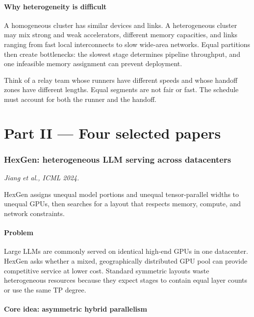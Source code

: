 \documentclass[10pt,a4paper]{article}
\begin{document}
\subsection{Why heterogeneity is difficult}

A homogeneous cluster has similar devices and links. A heterogeneous cluster may mix strong and weak accelerators, different memory capacities, and links ranging from fast local interconnects to slow wide-area networks. Equal partitions then create bottlenecks: the slowest stage determines pipeline throughput, and one infeasible memory assignment can prevent deployment.

\begin{plainbox}
Think of a relay team whose runners have different speeds and whose handoff zones have different lengths. Equal segments are not fair or fast. The schedule must account for both the runner and the handoff.
\end{plainbox}

\part*{Part II --- Four selected papers}

\section{HexGen: heterogeneous LLM serving across datacenters}

\textit{Jiang et al., ICML 2024.}

\begin{takeaway}
HexGen assigns unequal model portions and unequal tensor-parallel widths to unequal GPUs, then searches for a layout that respects memory, compute, and network constraints.
\end{takeaway}

\subsection{Problem}

Large LLMs are commonly served on identical high-end GPUs in one datacenter. HexGen asks whether a mixed, geographically distributed GPU pool can provide competitive service at lower cost. Standard symmetric layouts waste heterogeneous resources because they expect stages to contain equal layer counts or use the same TP degree.

\subsection{Core idea: asymmetric hybrid parallelism}
\end{document}
